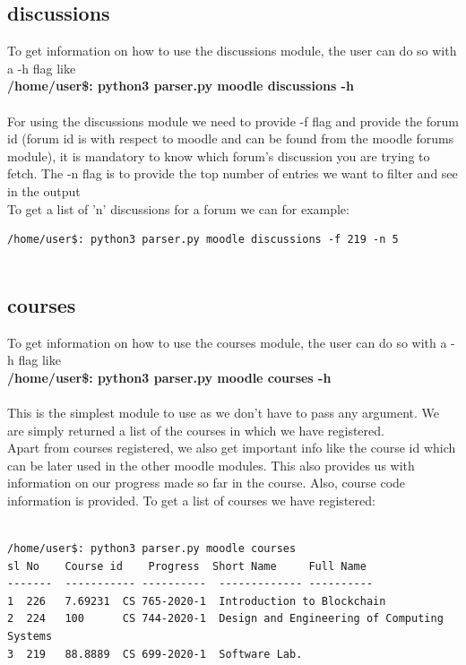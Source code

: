 \documentclass[12pt, letterpaper, twoside]{article}
\begin{document}
\subsection{discussions}
To get information on how to use the discussions module, the user can do so with a -h flag like \\
\textbf{/home/user\$: python3 parser.py moodle discussions -h}\\
\\
For using the discussions module we need to provide -f flag and provide the forum id (forum id is with respect to moodle and can be found from the moodle forums module), it is mandatory to know which forum's discussion you are trying to fetch. The -n flag is to provide the top number of entries we want to filter and see in the output\\
To get a list of 'n' discussions for a forum we can for example:

\begin{verbatim}
/home/user$: python3 parser.py moodle discussions -f 219 -n 5
    
\end{verbatim}

\subsection{courses}
To get information on how to use the courses module, the user can do so with a -h flag like \\
\textbf{/home/user\$: python3 parser.py moodle courses -h}\\
\\
This is the simplest module to use as we don't have to pass any argument. We are simply returned a list of the courses in which we have registered.\\
Apart from courses registered, we also get important info like the course id which can be later used in the other moodle modules.
This also provides us with information on our progress made so far in the course.
Also, course code information is provided.
To get a list of courses we have registered:\\
\\
\begin{verbatim}
/home/user$: python3 parser.py moodle courses
sl No    Course id    Progress  Short Name     Full Name
-------  ----------- ----------  ------------- ----------
1  226   7.69231  CS 765-2020-1  Introduction to Blockchain
2  224   100      CS 744-2020-1  Design and Engineering of Computing Systems
3  219   88.8889  CS 699-2020-1  Software Lab.
\end{verbatim}
\end{document}

